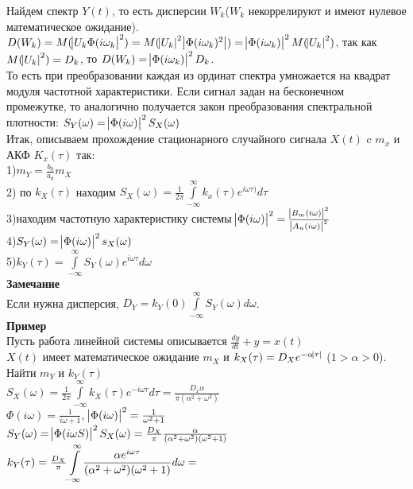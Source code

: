 \documentclass[russian, 12pt, fleqn,x11names]{article}
\begin{document}
Найдем спектр $Y(t)$, то есть дисперсии $W_k$($W_k$ некоррелируют и имеют нулевое математическое ожидание).\\
$D(W_k) = M(\abs{U_k \Phi(i\omega_k }^2 ) =  M(\abs{U_k}^2 \abs{\Phi(i\omega_k )^2 } ) = \abs{\Phi(i \omega_k)}^2 M(\abs{U_k}^2)$, так как $M(\abs{U_k}^2) = D_k$, то $D(W_k) = \abs{\Phi(i\omega_k)}^2 D_k$.\\
То есть при преобразовании каждая из ординат спектра умножается на квадрат модуля частотной характеристики. Если сигнал задан на бесконечном промежутке, то аналогично получается закон преобразования спектральной плотности: $S_Y(\omega) = \abs{\Phi(i\omega)}^2 S_X(\omega)$\\
Итак, описываем прохождение стационарного случайного сигнала $X(t)$ c $m_x$ и АКФ $K_x(\tau)$ так:\\
1)$m_Y = \frac{b_0}{a_0}m_X$\\
2) по $k_X(\tau)$ находим $S_X(\omega) = \frac{1}{2\pi}  \displaystyle{\int \limits _ { - \infty} ^ {\infty}} k_x(\tau) e ^{i \omega \tau)} d \tau$ \\
3)находим частотную характеристику системы $\abs{\Phi(i\omega)}^2 = \frac{\abs{B_m(i\omega)}^2}{\abs{A_n(i\omega)}^2}$\\
4)$S_Y(\omega) = \abs{\Phi(i\omega)}^2 s_X (\omega)$\\
5)$k_Y(\tau) =  \displaystyle{\int \limits_{-\infty}^{\infty}} S_Y (\omega) e^{i \omega \tau} d\omega$\\
\textbf{Замечание\ } \\
Если нужна дисперсия, $D_Y = k_Y(0) \displaystyle{\int \limits _ { - \infty} ^ {\infty}} S_Y (\omega) d \omega$.\\ 
\textbf{Пример}\\
Пусть работа линейной системы описывается $\frac{dy}{dt} + y = x(t)$\\
$X(t)$ имеет математическое ожидание $m_X$ и $k_X(\tau) = D_X e^{-\alpha \abs{\tau}}$ ($1 > \alpha > 0$). Найти $m_Y$ и $k_Y(\tau)$\\
$S_X(\omega)  = \frac{1}{2\pi} \displaystyle{\int \limits_{-\infty}^{\infty}} k_X (\tau)  e^{-i\omega \tau} d \tau = \frac{D_x \alpha}{\pi(\alpha^2 + \omega ^ 2)}$\\
$\Phi(i\omega) = \frac{1}{i\omega + 1}$, $\abs{\Phi(i\omega)}^2 = \frac{1}{\omega^2 + 1}$\\
$S_Y(\omega)  = \abs{\Phi(i\omega S)}^2S_X(\omega) = \frac{D_X}{\pi} \frac{\alpha}{(\alpha^2 + \omega^2)(\omega^2 + 1)}$\\
$k_Y(\tau) = \frac{D_X}{\pi} \displaystyle{ \int \limits _{-\infty}^{\infty} } \frac{\alpha e^{i \omega \tau} }{(\alpha^2 + \omega^2)(\omega^2 + 1)}d\omega =\\$
\end{document}
